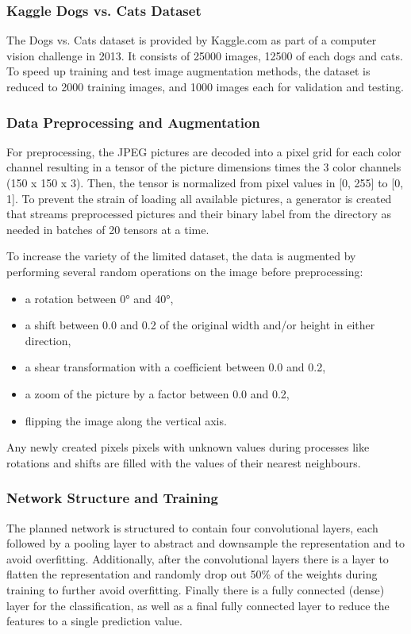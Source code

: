 \documentclass[sigconf, nonacm]{acmart}
\begin{document}
\subsubsection{Kaggle Dogs vs. Cats Dataset \cite{Kaggle}}
The Dogs vs. Cats dataset is provided by Kaggle.com as part of a computer vision challenge in 2013.
It consists of 25000 images, 12500 of each dogs and cats.
To speed up training and test image augmentation methods, the dataset is reduced to 2000 training images, and 1000 images each for validation and testing.

\subsubsection{Data Preprocessing and Augmentation}
For preprocessing, the JPEG pictures are decoded into a pixel grid for each color channel resulting in a tensor of the picture dimensions times the 3 color channels (150 x 150 x 3).
Then, the tensor is normalized from pixel values in [0, 255] to [0, 1].
To prevent the strain of loading all available pictures, a generator is created that streams preprocessed pictures and their binary label from the directory as needed in batches of 20 tensors at a time.

To increase the variety of the limited dataset, the data is augmented by performing several random operations on the image before preprocessing:
\begin{itemize}
\item a rotation between 0° and 40°,
\item a shift between 0.0 and 0.2 of the original width and/or height in either direction,
\item a shear transformation with a coefficient between 0.0 and 0.2,
\item a zoom of the picture by a factor between 0.0 and 0.2,
\item flipping the image along the vertical axis.
\end{itemize}
Any newly created pixels pixels with unknown values during processes like rotations and shifts are filled with the values of their nearest neighbours.

\subsubsection{Network Structure and Training}
The planned network is structured to contain four convolutional layers, each followed by a pooling layer to abstract and downsample the representation and to avoid overfitting.
Additionally, after the convolutional layers there is a layer to flatten the representation and randomly drop out 50\% of the weights during training to further avoid overfitting.
Finally there is a fully connected (dense) layer for the classification, as well as a final fully connected layer to reduce the features to a single prediction value.
\end{document}
